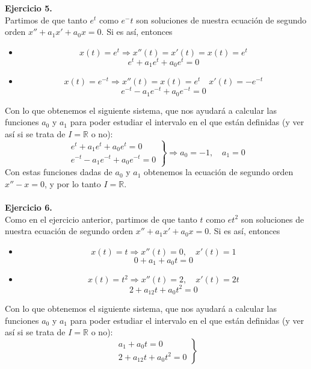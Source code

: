 \documentclass[fleqn]{article}
\def\R{\mathds{R}}
\begin{document}
    \textbf{Ejercicio 5.} \\
    

    
    Partimos de que tanto $e^t$ como $e^-t$ son soluciones de nuestra ecuación de segundo orden $x'' + a_1x' + a_0x=0$. Si es así, entonces 
    \begin{itemize}
        \item $$x(t)=e^t \Rightarrow x''(t)=x'(t)=x(t)=e^t$$
                $$e^t + a_1e^t + a_0e^t = 0$$
        \item $$x(t)=e^{-t} \Rightarrow x''(t)=x(t)=e^t \quad x'(t)=-e^{-t}$$
                $$e^{-t} - a_1e^{-t} + a_0e^{-t} = 0$$
    \end{itemize}
    
    Con lo que obtenemos el siguiente sistema, que nos ayudará a calcular las funciones $a_0$ y $ a_1$ para poder estudiar el intervalo en el que 
    están definidas (y ver así si se trata de $I=\R$ o no):
    \begin{equation*}
        \left.
        \begin{aligned}
            e^t + a_1e^t + a_0e^t = 0 \\
            e^{-t} - a_1e^{-t} + a_0e^{-t} = 0
        \end{aligned}
        \right\} \Rightarrow a_0=-1, \quad a_1=0
    \end{equation*}
    Con estas funciones dadas de $a_0$ y $ a_1$ obtenemos la ecuación de segundo orden $x'' - x=0$, y por lo tanto $I=\R$.\\ \\

    \textbf{Ejercicio 6.} \\

    Como en el ejercicio anterior, partimos de que tanto $t$ como $et^2$ son soluciones de nuestra ecuación de segundo orden 
    $x'' + a_1x' + a_0x=0$. Si es así, entonces 
    \begin{itemize}
        \item $$x(t)=t \Rightarrow x''(t)=0, \quad x'(t)=1$$
                $$0 + a_1 + a_0t = 0$$
        \item $$x(t)=t^2 \Rightarrow x''(t)=2, \quad x'(t)=2t$$
                $$2 + a_12t + a_0t^2 = 0$$
    \end{itemize}

    Con lo que obtenemos el siguiente sistema, que nos ayudará a calcular las funciones $a_0$ y $ a_1$ para poder estudiar el intervalo en el que 
    están definidas (y ver así si se trata de $I=\R$ o no):
    \begin{equation*}
        \left.
        \begin{aligned}
            a_1 + a_0t = 0 \\
            2 + a_12t + a_0t^2 = 0
        \end{aligned}
        \right\} 
    \end{equation*}
\end{document}

